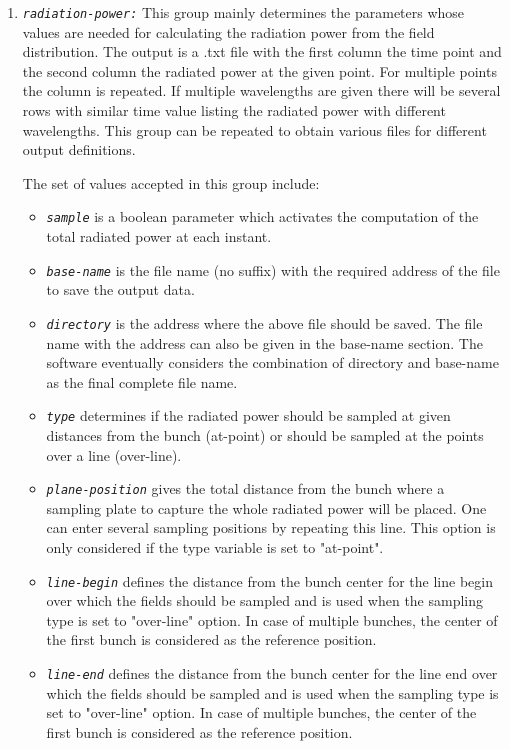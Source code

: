 \begin{enumerate}
\item {\tt \small \em radiation-power:} This group mainly determines the parameters whose values are needed for calculating the radiation power from the field distribution. The output is a .txt file with the first column the time point and the second column the radiated power at the given point. For multiple points the column is repeated. If multiple wavelengths are given there will be several rows with similar time value listing the radiated power with different wavelengths. This group can be repeated to obtain various files for different output definitions. %

The set of values accepted in this group include:
\begin{itemize}
	\item {\tt \small \em sample} is a boolean parameter which activates the computation of the total radiated power at each instant.
	\item {\tt \small \em base-name} is the file name (no suffix) with the required address of the file to save the output data.
	\item {\tt \small \em directory} is the address where the above file should be saved. The file name with the address can also be given in the base-name section. The software eventually considers the combination of directory and base-name as the final complete file name.
	\item {\tt \small \em type} determines if the radiated power should be sampled at given distances from the bunch (at-point) or should be sampled at the points over a line (over-line).
	\item {\tt \small \em plane-position} gives the total distance from the bunch where a sampling plate to capture the whole radiated power will be placed.  One can enter several sampling positions by repeating this line. This option is only considered if the type variable is set to "at-point".
	\item {\tt \small \em line-begin} defines the distance from the bunch center for the line begin over which the fields should be sampled and is used when the sampling type is set to "over-line" option. In case of multiple bunches, the center of the first bunch is considered as the reference position.
	\item {\tt \small \em line-end} defines the distance from the bunch center for the line end over which the fields should be sampled and is used when the sampling type is set to "over-line" option. In case of multiple bunches, the center of the first bunch is considered as the reference position.

\end{itemize}
\end{enumerate}
